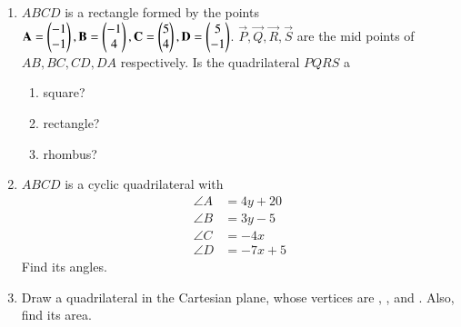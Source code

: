 \renewcommand{\theequation}{\theenumi}
\begin{enumerate}[label=\arabic*.,ref=\thesubsection.\theenumi]

\item $ABCD$ is a rectangle formed by the points $\mathbf{A} = \begin{pmatrix}-1\\-1\end{pmatrix}, \mathbf{B} = \begin{pmatrix}-1\\4\end{pmatrix}, \mathbf{C} = \begin{pmatrix}5\\4\end{pmatrix}, \mathbf{D} = \begin{pmatrix}5\\-1\end{pmatrix}$. $ \vec{P}, \vec{Q}, \vec{R}, \vec{S}$ are the mid points of $AB, BC, CD, DA$ respectively.  Is the quadrilateral $PQRS$ a 
\begin{enumerate}
\item square?
\item rectangle?
\item rhombus?
\end{enumerate}
\solution

\item $ABCD$ is a cyclic quadrilateral with 
\begin{align}
\angle A &= 4y+20
\\
\angle B &= 3y-5
\\
\angle C &= -4x
\\
\angle D &= -7x+5
\end{align}
%
Find its angles.
\\
\solution

\item Draw a quadrilateral in the Cartesian plane, whose vertices are , ,  and . Also, find its area.
\\
\solution



\end{enumerate}

